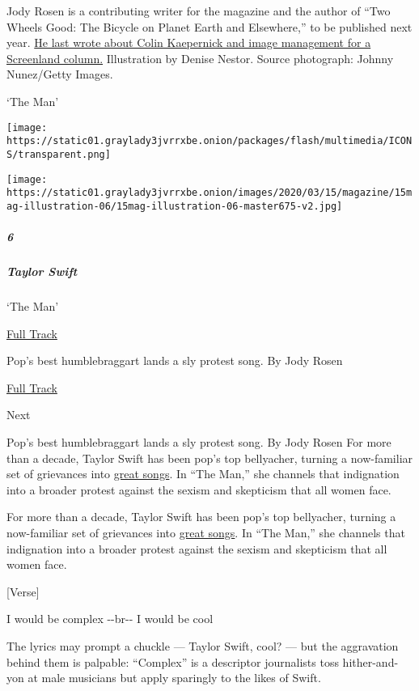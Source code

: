 Jody Rosen is a contributing writer for the magazine and the author of
``Two Wheels Good: The Bicycle on Planet Earth and Elsewhere,'' to be
published next year.
\href{https://www.nytimes3xbfgragh.onion/2019/12/12/magazine/colin-kaepernick-nfl-video.html}{He
last wrote about Colin Kaepernick and image management for a Screenland
column.} Illustration by Denise Nestor. Source photograph: Johnny
Nunez/Getty Images.

`The Man'

\texttt{[image: https://static01.graylady3jvrrxbe.onion/packages/flash/multimedia/ICONS/transparent.png]}

\texttt{[image: https://static01.graylady3jvrrxbe.onion/images/2020/03/15/magazine/15mag-illustration-06/15mag-illustration-06-master675-v2.jpg]}

\hypertarget{6}{%
\subparagraph{6}\label{6}}

\hypertarget{taylor-swift}{%
\subparagraph{Taylor Swift}\label{taylor-swift}}

`The Man'

\href{https://open.spotify.com/track/3RauEVgRgj1IuWdJ9fDs70}{ Full
Track}

Pop's best humblebraggart lands a sly protest song. By Jody Rosen

\href{https://open.spotify.com/track/3RauEVgRgj1IuWdJ9fDs70}{Full Track
}

Next

Pop's best humblebraggart lands a sly protest song. By Jody Rosen For
more than a decade, Taylor Swift has been pop's top bellyacher, turning
a now-familiar set of grievances into
\href{https://www.nytimes3xbfgragh.onion/2019/12/24/arts/music/taylor-swift-lover.html}{great
songs}. In ``The Man,'' she channels that indignation into a broader
protest against the sexism and skepticism that all women face.

For more than a decade, Taylor Swift has been pop's top bellyacher,
turning a now-familiar set of grievances into
\href{https://www.nytimes3xbfgragh.onion/2019/12/24/arts/music/taylor-swift-lover.html}{great
songs}. In ``The Man,'' she channels that indignation into a broader
protest against the sexism and skepticism that all women face.

{[}Verse{]}

I would be complex -\/-br-\/- I would be cool

The lyrics may prompt a chuckle --- Taylor Swift, cool? --- but the
aggravation behind them is palpable: ``Complex'' is a descriptor
journalists toss hither-and-yon at male musicians but apply sparingly to
the likes of Swift.

